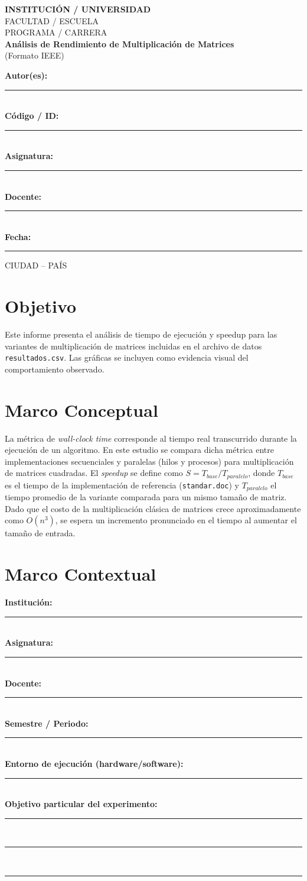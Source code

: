 \documentclass[conference]{IEEEtran}
\begin{document}
\begin{titlepage}
\centering
{\Large \textbf{INSTITUCIÓN / UNIVERSIDAD}}\\[0.8cm]
{\large FACULTAD / ESCUELA}\\[0.5cm]
{\large PROGRAMA / CARRERA}\\[2.0cm]
{\LARGE \textbf{Análisis de Rendimiento de Multiplicación de Matrices}}\\[0.8cm]
{\large (Formato IEEE)}\\[2.0cm]
\begin{flushleft}
\textbf{Autor(es):} \rule{10cm}{0.4pt}\\[0.4cm]
\textbf{Código / ID:} \rule{10cm}{0.4pt}\\[0.4cm]
\textbf{Asignatura:} \rule{10cm}{0.4pt}\\[0.4cm]
\textbf{Docente:} \rule{10cm}{0.4pt}\\[0.4cm]
\textbf{Fecha:} \rule{10cm}{0.4pt}
\end{flushleft}
\vfill
{\large CIUDAD -- PAÍS}
\end{titlepage}
\tableofcontents
\clearpage
\onecolumn
\section{Objetivo}
Este informe presenta el análisis de tiempo de ejecución y speedup para las variantes de multiplicación de matrices incluidas en el archivo de datos \texttt{resultados.csv}. Las gráficas se incluyen como evidencia visual del comportamiento observado.
\section{Marco Conceptual}
La métrica de \textit{wall-clock time} corresponde al tiempo real transcurrido durante la ejecución de un algoritmo. En este estudio se compara dicha métrica entre implementaciones secuenciales y paralelas (hilos y procesos) para multiplicación de matrices cuadradas.
El \textit{speedup} se define como $S = T_{base} / T_{paralelo}$, donde $T_{base}$ es el tiempo de la implementación de referencia (\texttt{standar.doc}) y $T_{paralelo}$ el tiempo promedio de la variante comparada para un mismo tamaño de matriz.
Dado que el costo de la multiplicación clásica de matrices crece aproximadamente como $O(n^3)$, se espera un incremento pronunciado en el tiempo al aumentar el tamaño de entrada.
\section{Marco Contextual}
\textbf{Institución:} \rule{12cm}{0.4pt}\\[0.3cm]
\textbf{Asignatura:} \rule{12cm}{0.4pt}\\[0.3cm]
\textbf{Docente:} \rule{12cm}{0.4pt}\\[0.3cm]
\textbf{Semestre / Periodo:} \rule{12cm}{0.4pt}\\[0.3cm]
\textbf{Entorno de ejecución (hardware/software):} \rule{8cm}{0.4pt}\\[0.3cm]
\textbf{Objetivo particular del experimento:} \\[-0.1cm]
\rule{\textwidth}{0.4pt}\\[0.2cm]
\rule{\textwidth}{0.4pt}\\[0.2cm]
\rule{\textwidth}{0.4pt}
\end{document}
